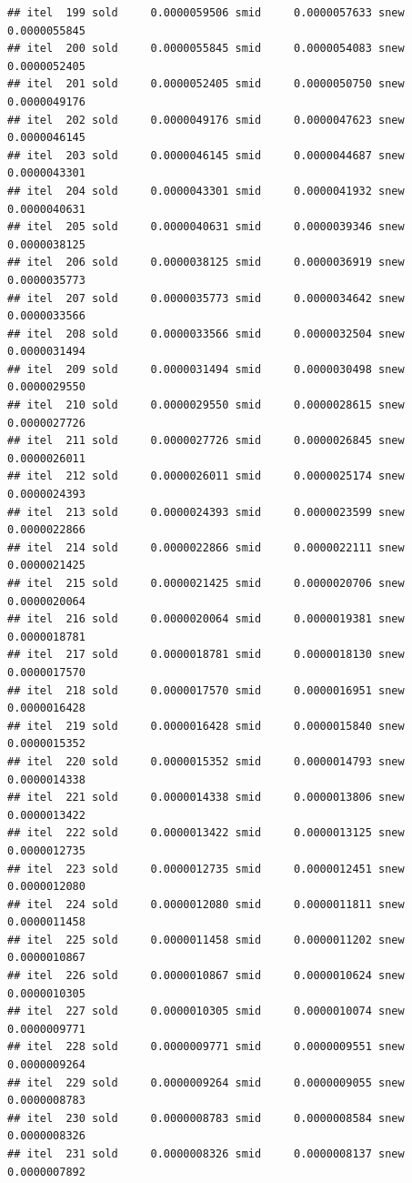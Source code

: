 \documentclass[
  12pt,
]{article}
\begin{document}
\begin{verbatim}
## itel  199 sold     0.0000059506 smid     0.0000057633 snew     0.0000055845 
## itel  200 sold     0.0000055845 smid     0.0000054083 snew     0.0000052405 
## itel  201 sold     0.0000052405 smid     0.0000050750 snew     0.0000049176 
## itel  202 sold     0.0000049176 smid     0.0000047623 snew     0.0000046145 
## itel  203 sold     0.0000046145 smid     0.0000044687 snew     0.0000043301 
## itel  204 sold     0.0000043301 smid     0.0000041932 snew     0.0000040631 
## itel  205 sold     0.0000040631 smid     0.0000039346 snew     0.0000038125 
## itel  206 sold     0.0000038125 smid     0.0000036919 snew     0.0000035773 
## itel  207 sold     0.0000035773 smid     0.0000034642 snew     0.0000033566 
## itel  208 sold     0.0000033566 smid     0.0000032504 snew     0.0000031494 
## itel  209 sold     0.0000031494 smid     0.0000030498 snew     0.0000029550 
## itel  210 sold     0.0000029550 smid     0.0000028615 snew     0.0000027726 
## itel  211 sold     0.0000027726 smid     0.0000026845 snew     0.0000026011 
## itel  212 sold     0.0000026011 smid     0.0000025174 snew     0.0000024393 
## itel  213 sold     0.0000024393 smid     0.0000023599 snew     0.0000022866 
## itel  214 sold     0.0000022866 smid     0.0000022111 snew     0.0000021425 
## itel  215 sold     0.0000021425 smid     0.0000020706 snew     0.0000020064 
## itel  216 sold     0.0000020064 smid     0.0000019381 snew     0.0000018781 
## itel  217 sold     0.0000018781 smid     0.0000018130 snew     0.0000017570 
## itel  218 sold     0.0000017570 smid     0.0000016951 snew     0.0000016428 
## itel  219 sold     0.0000016428 smid     0.0000015840 snew     0.0000015352 
## itel  220 sold     0.0000015352 smid     0.0000014793 snew     0.0000014338 
## itel  221 sold     0.0000014338 smid     0.0000013806 snew     0.0000013422 
## itel  222 sold     0.0000013422 smid     0.0000013125 snew     0.0000012735 
## itel  223 sold     0.0000012735 smid     0.0000012451 snew     0.0000012080 
## itel  224 sold     0.0000012080 smid     0.0000011811 snew     0.0000011458 
## itel  225 sold     0.0000011458 smid     0.0000011202 snew     0.0000010867 
## itel  226 sold     0.0000010867 smid     0.0000010624 snew     0.0000010305 
## itel  227 sold     0.0000010305 smid     0.0000010074 snew     0.0000009771 
## itel  228 sold     0.0000009771 smid     0.0000009551 snew     0.0000009264 
## itel  229 sold     0.0000009264 smid     0.0000009055 snew     0.0000008783 
## itel  230 sold     0.0000008783 smid     0.0000008584 snew     0.0000008326 
## itel  231 sold     0.0000008326 smid     0.0000008137 snew     0.0000007892 

\end{verbatim}
\end{document}
